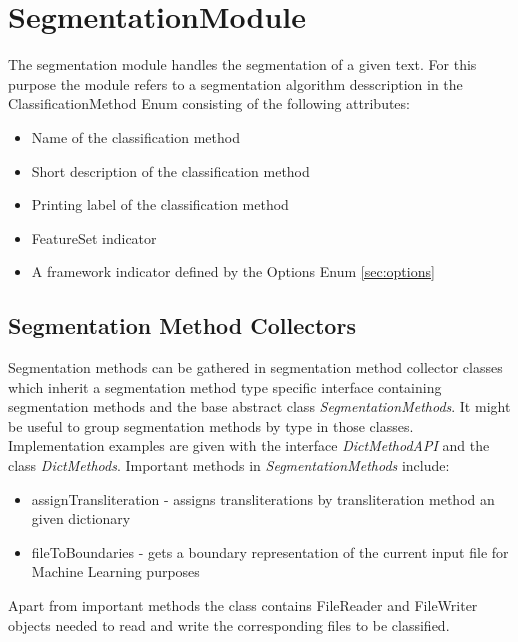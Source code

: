 \documentclass[10pt,a4paper,titlepage]{report}
\begin{document}
	\section{SegmentationModule}
	\label{sec:segmentationModule}
	The segmentation module handles the segmentation of a given text. For this purpose the module refers to a segmentation algorithm desscription in the ClassificationMethod Enum consisting of the following attributes: 
	\begin{itemize}
		\item Name of the classification method
		\item Short description of the classification method
		\item Printing label of the classification method
		\item FeatureSet indicator
		\item A framework indicator defined by the Options Enum \ref{sec:options}
	\end{itemize}
	\subsection{Segmentation Method Collectors}
	Segmentation methods can be gathered in segmentation method collector classes which inherit a segmentation method type specific interface containing segmentation methods and the base abstract class \textit{SegmentationMethods}. It might be useful to group segmentation methods by type in those classes. Implementation examples are given with the interface \textit{DictMethodAPI} and the class \textit{DictMethods}.
	Important methods in \textit{SegmentationMethods} include:
	\begin{itemize}
		\item assignTransliteration - assigns transliterations by transliteration method an given dictionary
		\item fileToBoundaries - gets a boundary representation of the current input file for Machine Learning purposes
	\end{itemize}
	Apart from important methods the class contains FileReader and FileWriter objects needed to read and write the corresponding files to be classified.
\end{document}
